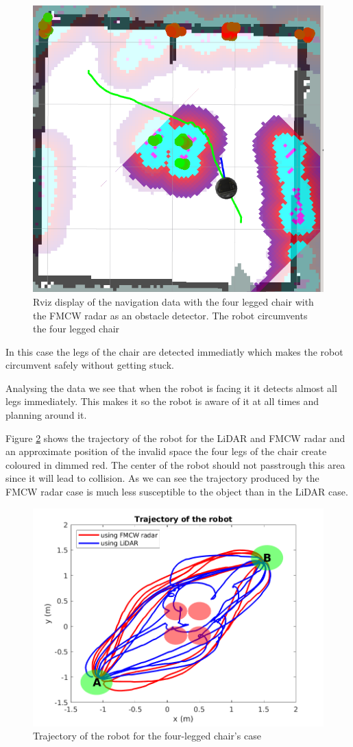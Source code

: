 \begin{figure}[ht!]
\centerline{\includegraphics [width=0.5 \textwidth]{imgs/chapter5/rviznchairradar.png}}
\caption{Rviz display of the navigation data with the four legged chair with the \ac{FMCW} \ac{radar} as an obstacle detector. The robot circumvents the four legged chair}
\label{fig:rviznchairradar}
\end{figure}
In this case the legs of the chair are detected immediatly which makes the robot circumvent safely without getting stuck. 


Analysing the data we see that when the robot is facing it it detects almost all legs immediately. 
This makes it so the robot is aware of it at all times and planning around it.


Figure \ref{fig:traj2} shows the trajectory of the robot for the \ac{LiDAR} and \ac{FMCW} \ac{radar} and an approximate position of the invalid space the four legs of the chair create coloured in dimmed red. The center of the robot should not passtrough this area since it will lead to collision. As we can see the trajectory  produced by the \ac{FMCW} radar case is much less susceptible to the object than in the \ac{LiDAR} case. 
\begin{figure}[ht!]
\centerline{\includegraphics [width=0.7 \textwidth]{imgs/chapter5/traj2.png}}
\caption{Trajectory of the robot for the four-legged chair's case}
\label{fig:traj2}
\end{figure}

